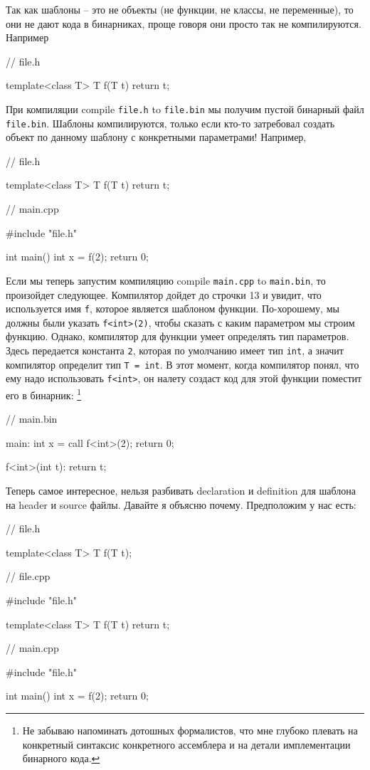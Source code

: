 Так как шаблоны -- это не объекты (не функции, не классы, не переменные), то они не дают кода в бинарниках, проще говоря они просто так не компилируются.
Например
\begin{cppcode}
// file.h

template<class T>
T f(T t) {
  return t;
}
\end{cppcode}
При компиляции compile \verb"file.h" to \verb"file.bin" мы получим пустой бинарный файл \verb"file.bin".
Шаблоны компилируются, только если кто-то затребовал создать объект по данному шаблону с конкретными параметрами!
Например,
\begin{cppcode}
// file.h

template<class T>
T f(T t) {
  return t;
}

// main.cpp

#include "file.h"

int main() {
  int x = f(2);
  return 0;
}
\end{cppcode}
Если мы теперь запустим компиляцию compile \verb"main.cpp" to \verb"main.bin", то произойдет следующее.
Компилятор дойдет до строчки 13 и увидит, что используется имя \verb"f", которое является шаблоном функции.
По-хорошему, мы должны были указать \verb"f<int>(2)", чтобы сказать с каким параметром мы строим функцию.
Однако, компилятор для функции умеет определять тип параметров.
Здесь передается константа \verb"2", которая по умолчанию имеет тип \verb"int", а значит компилятор определит тип \verb"T = int".
В этот момент, когда компилятор понял, что ему надо использовать \verb"f<int>", он налету создаст код для этой функции поместит его в бинарник:%
\footnote{Не забываю напоминать дотошных формалистов, что мне глубоко плевать на конкретный синтаксис конкретного ассемблера и на детали имплементации бинарного кода.}
\begin{cppcode}
// main.bin

main:
  int x = call f<int>(2);
  return 0;

f<int>(int t):
  return t;
\end{cppcode}
Теперь самое интересное, нельзя разбивать declaration и definition для шаблона на header и source файлы.
Давайте я объясню почему.
Предположим у нас есть:
\begin{cppcode}
// file.h

template<class T>
T f(T t);

// file.cpp

#include "file.h"

template<class T>
T f(T t) {
  return t;
}

// main.cpp

#include "file.h"

int main() {
  int x = f(2);
  return 0;
}
\end{cppcode}
